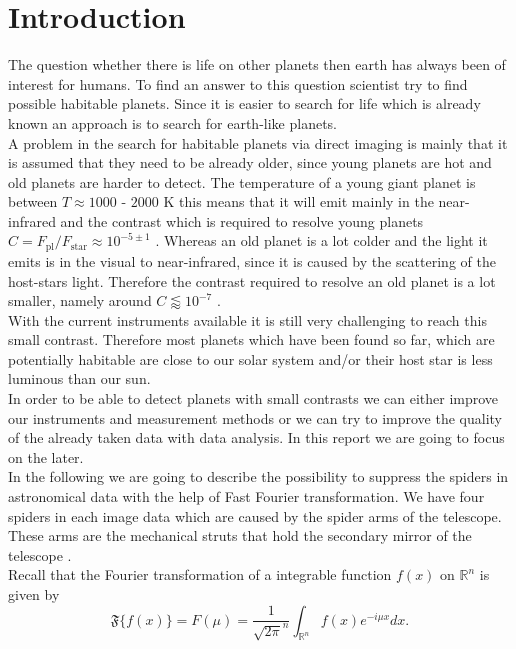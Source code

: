 \section{Introduction}
The question whether there is life on other planets then earth has always been of interest for humans. To find an answer to this question scientist try to find possible habitable planets. Since it is easier to search for life which is already known an approach is to search for earth-like planets.\\
A problem in the search for habitable planets via direct imaging is mainly that it is assumed that they need to be already older, since young planets are hot and old planets are harder to detect. The temperature of a young giant planet is between $T \approx 1000$ - $2000$ K this means that it will emit mainly in the near-infrared and the contrast which is required to resolve young planets $C = F_{\mathrm{pl}}/F_{\mathrm{star}} \approx 10^{-5 \pm 1}$ \cite{Hunziker2020}. Whereas an old planet is a lot colder and the light it emits is in the visual to near-infrared, since it is caused by the scattering of the host-stars light. Therefore the contrast required to resolve an old planet is a lot smaller, namely around $C \lessapprox 10^{-7}$ \cite{Hunziker2020}.\\
With the current instruments available it is still very challenging to reach this small contrast. Therefore most planets which have been found so far, which are potentially habitable are close to our solar system and/or their host star is less luminous than our sun.\\
In order to be able to detect planets with small contrasts we can either improve our instruments and measurement methods or we can try to improve the quality of the already taken data with data analysis. In this report we are going to focus on the later. \\
In the following we are going to describe the possibility to suppress the spiders in astronomical data with the help of Fast Fourier transformation. We have four spiders in each image data which are caused by the spider arms of the telescope. These arms are the mechanical struts that hold the secondary mirror of the telescope \cite{ESOmanual}.\\
Recall that the Fourier transformation of a integrable function $f(x)$ on $\mathbb{R}^n$ is given by
\begin{equation}
	\mathfrak{F}\{f(x)\} = F(\mu) = \frac{1}{\sqrt{2\pi}^n} \int_{\mathbb{R}^n} f(x) e^{-i\mu x} dx.
\end{equation}
